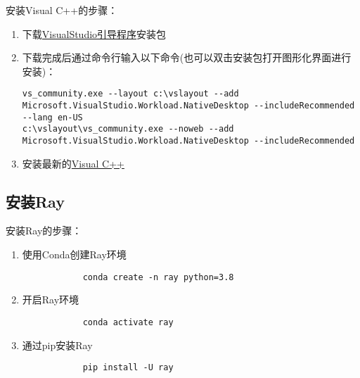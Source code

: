 安装Visual C++的步骤：
\begin{enumerate}
    \item 下载\href{https://visualstudio.microsoft.com/downloads/}{VisualStudio引导程序}安装包
    \item 下载完成后通过命令行输入以下命令(也可以双击安装包打开图形化界面进行安装)：
          \lstset{language=Bash, breaklines, columns=flexible, numbers=left, numbersep=5pt}
          \begin{lstlisting}
vs_community.exe --layout c:\vslayout --add Microsoft.VisualStudio.Workload.NativeDesktop --includeRecommended --lang en-US
c:\vslayout\vs_community.exe --noweb --add Microsoft.VisualStudio.Workload.NativeDesktop --includeRecommended
        \end{lstlisting}
    \item 安装最新的\href{https://support.microsoft.com/en-us/help/2977003/the-latest-supported-visual-c-downloads}{Visual C++}
\end{enumerate}

\subsection{安装Ray}
安装Ray的步骤：
\begin{enumerate}
    \item 使用Conda创建Ray环境
          \lstset{language=Bash, breaklines, columns=flexible}
          \begin{lstlisting}
            conda create -n ray python=3.8
          \end{lstlisting}
    \item 开启Ray环境
          \lstset{language=Bash, breaklines, columns=flexible}
          \begin{lstlisting}
            conda activate ray
          \end{lstlisting}
    \item 通过pip安装Ray
          \lstset{language=Bash, breaklines, columns=flexible}
          \begin{lstlisting}
            pip install -U ray
          \end{lstlisting}
\end{enumerate}